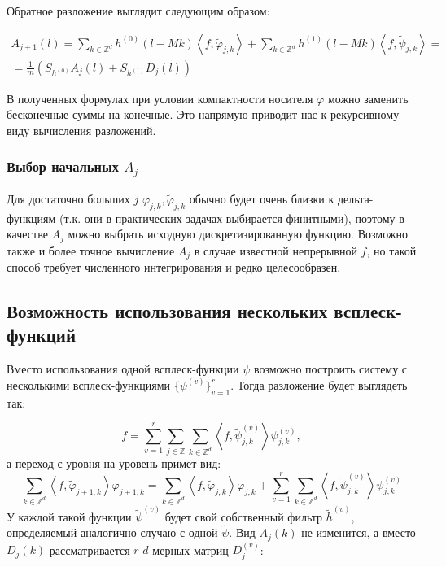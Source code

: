 \documentclass[a4paper,article,14pt]{extarticle}
\begin{document}
Обратное разложение выглядит следующим образом:

\[
	\begin{split}
		A_{j+1} (l) = \sum_{k \in \mathbb{Z}^d}h^{(0)}(l-Mk) \left< f, \widetilde{\varphi}_{j,k}\right> + \sum_{k \in \mathbb{Z}^d} h^{(1)} (l-Mk) \left< f, \widetilde{\psi}_{j,k}\right> = \\
		= \frac{1}{m} \left( S_{h^{(0)}} A_j (l) + S_{h^{(1)}} D_j (l)\right)
\end{split}
\]

В полученных формулах при условии компактности носителя $\varphi$ можно заменить бесконечные суммы на конечные. Это напрямую приводит нас к рекурсивному виду вычисления разложений.

\subsubsection{Выбор начальных $A_j$}

Для достаточно больших $j$ $\varphi_{j,k}, \widetilde{\varphi}_{j,k}$ обычно будет очень близки к дельта-функциям (т.к. они в практических задачах выбирается финитными), поэтому в качестве $A_j$ можно выбрать исходную дискретизированную функцию. Возможно также и более точное вычисление $A_j$ в случае известной непрерывной $f$, но такой способ требует численного интегрирования и редко целесообразен.

\subsection{Возможность использования нескольких всплеск-функций}

Вместо использования одной всплеск-функции $\psi$ возможно построить систему с несколькими всплеск-функциями $\{\psi^{(v)}\}_{v=1}^r$. Тогда разложение будет выглядеть так:

\[
	f = \sum_{v = 1}^r \sum_{j \in \mathbb{Z}} \sum_{k \in \mathbb{Z}^d} \left< f, \widetilde{\psi}_{j,k}^{(v)}\right> \psi_{j,k}^{(v)},
\]
а переход с уровня на уровень примет вид:
\[
	\sum_{k \in \mathbb{Z}^d} \left< f, \widetilde{\varphi}_{j+1,k}\right> \varphi_{j+1,k} = \sum_{k \in \mathbb{Z}^d} \left< f, \widetilde{\varphi}_{j,k}\right> \varphi_{j,k} + \sum_{v=1}^r \sum_{k \in \mathbb{Z}^d} \left< f, \widetilde{\psi}_{j,k}^{(v)}\right>\psi_{j,k}^{(v)}
\]
У каждой такой функции $\widetilde{\psi}^{(v)}$ будет свой собственный фильтр $\widetilde{h}^{(v)}$, определяемый аналогично случаю с одной $\widetilde{\psi}$. Вид $A_j(k)$ не изменится, а вместо $D_j(k)$ рассматривается $r$ $d$-мерных матриц $D_j^{(v)}$:
\end{document}
